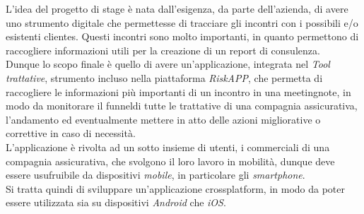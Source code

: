 L'idea del progetto di stage è nata dall'esigenza, da parte dell'azienda, di avere uno strumento digitale che permettesse di tracciare gli incontri con i possibili e/o esistenti \glspl{cliente}\glsoccur.
Questi incontri sono molto importanti, in quanto permettono di raccogliere informazioni utili per la creazione di un report di consulenza.\\
Dunque lo scopo finale è quello di avere un'applicazione, integrata nel \emph{Tool trattative}, strumento incluso nella piattaforma \emph{RiskAPP}, che permetta di raccogliere le informazioni più importanti di un incontro in una \gls{meetingnote}\glsoccur, in modo da monitorare il \gls{funnel}\glsoccur di tutte le trattative di una compagnia assicurativa, l'andamento ed eventualmente mettere in atto delle azioni migliorative o correttive in caso di necessità.\\
L'applicazione è rivolta ad un sotto insieme di utenti, i commerciali di una compagnia assicurativa, che svolgono il loro lavoro in mobilità, dunque deve essere usufruibile da dispositivi \emph{mobile}, in particolare gli \emph{smartphone}.\\
Si tratta quindi di sviluppare un'applicazione \gls{crossplatform}\glsoccur, in modo da poter essere utilizzata sia su dispositivi \emph{Android} che \emph{iOS}.


    
    
    
    
    
